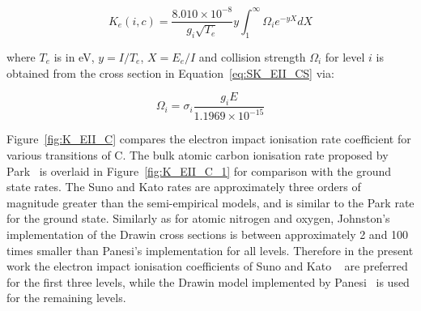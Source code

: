 \begin{equation}
 K_e(i,c) = \frac{8.010 \times 10^{-8}}{g_i \sqrt{T_e}} y \int_1^\infty \Omega_i e^{-y X} dX 
\end{equation}

\noindent where $T_e$ is in eV, $y = I / T_e$, $X = E_e / I$ and collision strength $\Omega_i$ for level $i$ is obtained from the cross section in Equation~\ref{eq:SK_EII_CS} via:

\begin{equation}
 \Omega_i = \sigma_{i} \frac{g_i E}{1.1969 \times 10^{-15}}   
\end{equation}

\par

Figure~\ref{fig:K_EII_C} compares the electron impact ionisation rate coefficient for various transitions of C.
The bulk atomic carbon ionisation rate proposed by Park~\cite{park_1994} is overlaid in Figure~\ref{fig:K_EII_C_1} for comparison with the ground state rates.
The Suno and Kato rates are approximately three orders of magnitude greater than the semi-empirical models, and is similar to the Park rate for the ground state.
Similarly as for atomic nitrogen and oxygen, Johnston's implementation of the Drawin cross sections is between approximately 2 and 100 times smaller than Panesi's implementation for all levels.
Therefore in the present work the electron impact ionisation coefficients of Suno and Kato ~\cite{SK2006} are preferred for the first three levels, while the Drawin model implemented by Panesi~\cite{JohnPhd} is used for the remaining levels.

